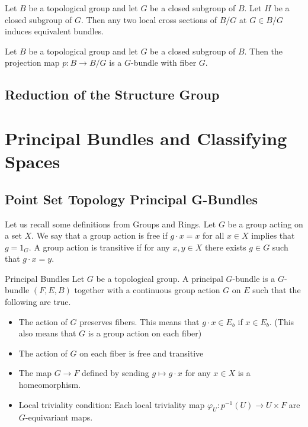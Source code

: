 \documentclass[a4paper]{article}
\begin{document}
\begin{thm}{}{} Let $B$ be a topological group and let $G$ be a closed subgroup of $B$. Let $H$ be a closed subgroup of $G$. Then any two local cross sections of $B/G$ at $G\in B/G$ induces equivalent bundles. 
\end{thm}

\begin{crl}{}{} Let $B$ be a topological group and let $G$ be a closed subgroup of $B$. Then the projection map $p:B\to B/G$ is a $G$-bundle with fiber $G$. 
\end{crl}

\subsection{Reduction of the Structure Group}

\pagebreak
\section{Principal Bundles and Classifying Spaces}
\subsection{Point Set Topology Principal G-Bundles}
Let us recall some definitions from Groups and Rings. Let $G$ be a group acting on a set $X$. We say that a group action is free if $g\cdot x=x$ for all $x\in X$ implies that $g=1_G$. A group action is transitive if for any $x,y\in X$ there exists $g\in G$ such that $g\cdot x=y$. 

\begin{defn}{Principal Bundles}{} Let $G$ be a topological group. A principal $G$-bundle is a $G$-bundle $(F,E,B)$ together with a continuous group action $G$ on $E$ such that the following are true. 
\begin{itemize}
\item The action of $G$ preserves fibers. This means that $g\cdot x\in E_b$ if $x\in E_b$. (This also means that $G$ is a group action on each fiber)
\item The action of $G$ on each fiber is free and transitive
\item The map $G\to F$ defined by sending $g\mapsto g\cdot x$ for any $x\in X$ is a homeomorphism. 
\item Local triviality condition: Each local triviality map $\varphi_U:p^{-1}(U)\to U\times F$ are $G$-equivariant maps. 
\end{itemize}
\end{defn}
\end{document}
